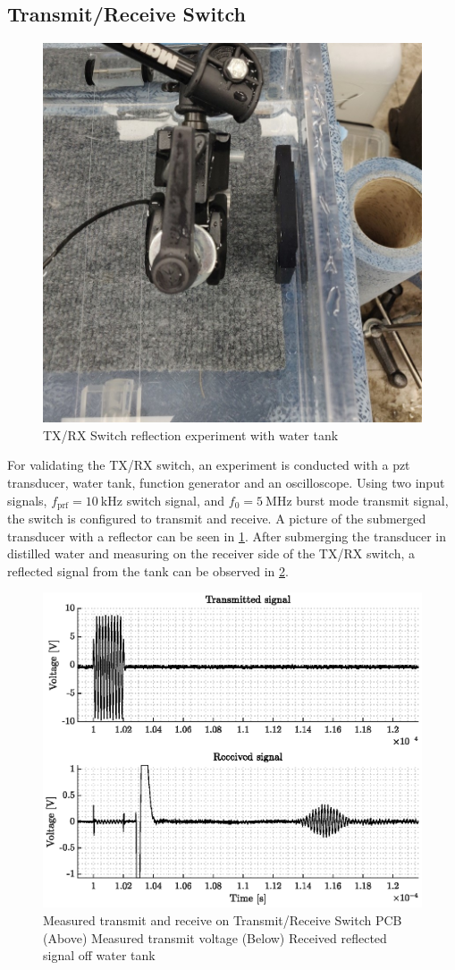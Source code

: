 \subsection{Transmit/Receive Switch}
\begin{figure}[htbp]
	\centering
	\includegraphics[width=.8\textwidth]{Figures/4_switch_meas_pic.jpg}
	\caption{TX/RX Switch reflection experiment with water tank}
	\label{fig:4_switch_meas_pic}
\end{figure}
For validating the TX/RX switch, an experiment is conducted with a \gls{pzt} transducer, water tank, function generator and an oscilloscope. Using two input signals, $f_{\mathrm{prf}}=\qty{10}{\kilo\hertz}$ switch signal, and $f_{0}=\qty{5}{\mega\hertz}$ burst mode transmit signal, the switch is configured to transmit and receive. A picture of the submerged transducer with a reflector can be seen in \cref{fig:4_switch_meas_pic}. After submerging the transducer in distilled water and measuring on the receiver side of the TX/RX switch, a reflected signal from the tank can be observed in \cref{fig:4_txrx_meas}.
\begin{figure}[htbp]
	\centering
	\includegraphics[width=.8\textwidth]{Figures/4_switch_pcb_meas.eps}
	\caption[Measured transmit and receive on Transmit/Receive Switch PCB]{Measured transmit and receive on Transmit/Receive Switch PCB (Above) Measured transmit voltage (Below) Received reflected signal off water tank}
	\label{fig:4_txrx_meas}
\end{figure}

